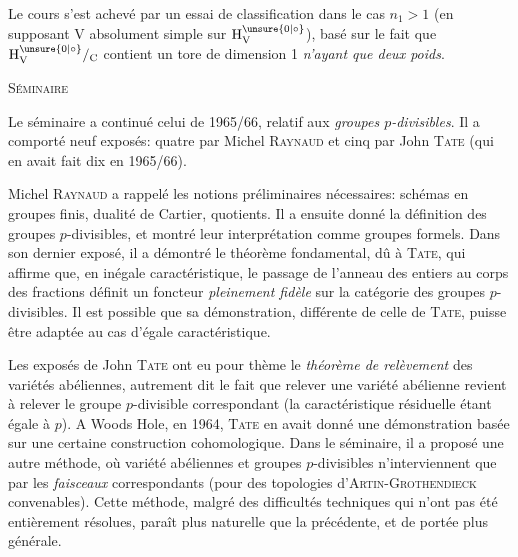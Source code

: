 Le cours s'est achevé par un essai de classification dans le cas $n_1>1$ (en supposant $\mathrm V$ absolument simple sur $\mathrm H_{\mathrm V}^{\unsure{0|\circ}}$), basé sur le fait que $\mathrm H_{\mathrm V}^{\unsure{0|\circ}}/_{\mathrm C}$ contient un tore de dimension 1 \textit{n'ayant que deux poids}.

\begin{center}\textsc{Séminaire}\end{center}

Le séminaire a continué celui de 1965/66, relatif aux \textit{groupes $p$-divisibles}. Il a comporté neuf exposés: quatre par Michel \textsc{Raynaud} et cinq par John \textsc{Tate} (qui en avait fait dix en 1965/66).

Michel \textsc{Raynaud} a rappelé les notions préliminaires nécessaires: schémas en groupes finis, dualité de Cartier, quotients. Il a ensuite donné la définition des groupes $p$-divisibles, et montré leur interprétation comme groupes formels. Dans son dernier exposé, il a démontré le théorème fondamental, dû à \textsc{Tate}, qui affirme que, en inégale caractéristique, le passage de l'anneau des entiers au corps des fractions définit un foncteur \textit{pleinement fidèle} sur la catégorie des groupes $p$-divisibles. Il est possible que sa démonstration, différente de celle de \textsc{Tate}, puisse être adaptée au cas d'égale caractéristique.

Les exposés de John \textsc{Tate} ont eu pour thème le \textit{théorème de relèvement} des variétés abéliennes, autrement dit le fait que relever une variété abélienne revient à relever le groupe $p$-divisible correspondant (la caractéristique résiduelle étant égale à $p$). A Woods Hole, en 1964, \textsc{Tate} en avait donné une démonstration basée sur une certaine construction cohomologique. Dans le séminaire, il a proposé une autre méthode, où variété abéliennes et groupes $p$-divisibles n'interviennent que par les \textit{faisceaux} correspondants (pour des topologies d'\textsc{Artin-Grothendieck} convenables). Cette méthode, malgré des difficultés techniques qui n'ont pas été entièrement résolues, paraît plus naturelle que la précédente, et de portée plus générale.

